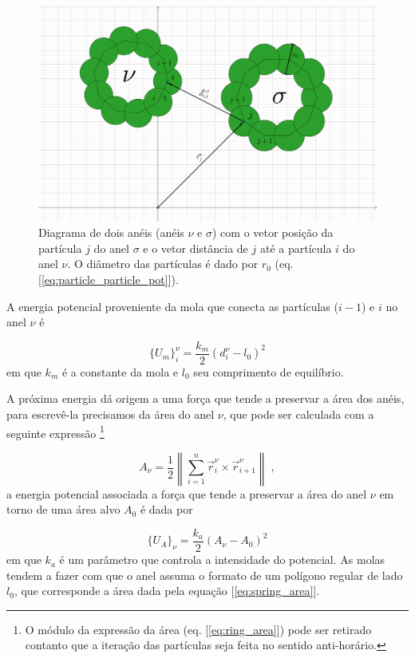 \documentclass{article}
\theoremstyle{definition}
\newcommand\norm[1]{\left\lVert#1\right\rVert}
\def \quantity#1#2#3{\vec{#1}_{#2}^{#3}}
\def \quantitysc#1#2#3{{#1}_{#2}^{#3}}
\def \pos#1#2{\quantity{r}{#1}{#2}}
\def \deslocsc#1#2{\quantitysc{d}{#1}{#2}}
\begin{document}
\begin{figure}[h]
    \centering
    \includegraphics[width=\linewidth]{figuras/rings_diagram.png}
    \caption{Diagrama de dois anéis (anéis $\nu$ e $\sigma$) com o vetor posição da partícula $j$ do anel $\sigma$ e o vetor distância de $j$ até a partícula $i$ do anel $\nu$. O diâmetro das partículas é dado por $r_0$ (eq. [\ref{eq:particle_particle_pot}]).}
    \label{fig:rings_diagram}
\end{figure}

A energia potencial proveniente da mola que conecta as partículas ($i-1$) e $i$ no anel $\nu$ é

\begin{equation}
    {\{U_m\}}_{i}^{\nu} = \frac{k_m}{2}(\deslocsc{i}{\nu} - l_0)^2
\label{eq:spring_pot}
\end{equation}
em que $k_m$ é a constante da mola e $l_0$ seu comprimento de equilíbrio.

A próxima energia dá origem a uma força que tende a preservar a área dos anéis, para escrevê-la precisamos da área do anel $\nu$, que pode ser calculada com a seguinte expressão \footnote{O módulo da expressão da área (eq. [\ref{eq:ring_area}]) pode ser retirado contanto que a iteração das partículas seja feita no sentido anti-horário.}

\begin{equation}
    A_\nu = \frac{1}{2}\norm{\sum_{i=1}^{n}\pos{i}{\nu} \times \pos{i+1}{\nu}}\;,
\label{eq:ring_area}
\end{equation}
a energia potencial associada a força que tende a preservar a área do anel $\nu$ em torno de uma área alvo $A_0$ é dada por

\begin{equation}
    {\{U_A\}}_{\nu} = \frac{k_a}{2}(A_{\nu} - A_0)^2
\label{eq:area_pot}
\end{equation}
em que $k_a$ é um parâmetro que controla a intensidade do potencial. As molas tendem a fazer com que o anel assuma o formato de um polígono regular de lado $l_0$, que corresponde a área dada pela equação [\ref{eq:spring_area}]. 
\end{document}
